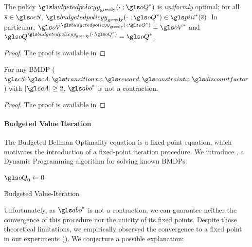 \begin{proposition}
    \label{prop:greedy_optimal}
    The  policy $\budgetedpolicy_\text{greedy}(\cdot~; \oQ^*)$ is \emph{uniformly} optimal: for all $\os\in\ocS$, $\budgetedpolicy_\text{greedy}(\cdot~; \oQ^*)\in\policies^*(\os)$. In particular, $\oV^{\budgetedpolicy_\text{greedy}(\cdot; \oQ^*)} = \oV^*$ and $\oQ^{\budgetedpolicy_\text{greedy}(\cdot; \oQ^*)}= \oQ^*$.
\end{proposition}

\begin{proof}
    The proof is available in 
\end{proof}

\begin{theorem}
    \label{thm:contraction}
    For any \gls{BMDP} ($\cS,\cA,\transition,\reward,\constraint,\discountfactor$) with $|\cA| \geq 2$, $\abo^{*}$ is not a contraction.
\end{theorem}

\begin{proof}
    The proof is available in 
\end{proof}

\paragraph{Budgeted Value Iteration}


The Budgeted Bellman Optimality equation is a fixed-point equation, which motivates the introduction of a fixed-point iteration procedure. We introduce , a Dynamic Programming algorithm for solving known \glspl{BMDP}.

\begin{algorithm}
    \DontPrintSemicolon
    \KwData{$\transition, \reward, \constraint$}
    \KwResult{$\oQ^*$}
    $\oQ_{0} \leftarrow 0$\;
    \caption{Budgeted Value-Iteration}
    \label{algo:bvi}

\end{algorithm}

Unfortunately, as $\abo^{*}$ is not a contraction, we can guarantee neither the convergence of this procedure nor the unicity of its fixed points. Despite those theoretical limitations, we empirically observed the convergence to a fixed point in our experiments (). We conjecture a possible explanation:

